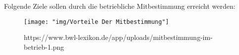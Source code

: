 Folgende Ziele sollen durch die betriebliche Mitbestimmung erreicht werden:
\begin{figure} [H]
	\centering
	\texttt{[image: "img/Vorteile Der Mitbestimmung"]}
	\caption{https://www.bwl-lexikon.de/app/uploads/mitbestimmung-im-betrieb-1.png}
	\label{fig:vorteile-der-mitbestimmung}
\end{figure}